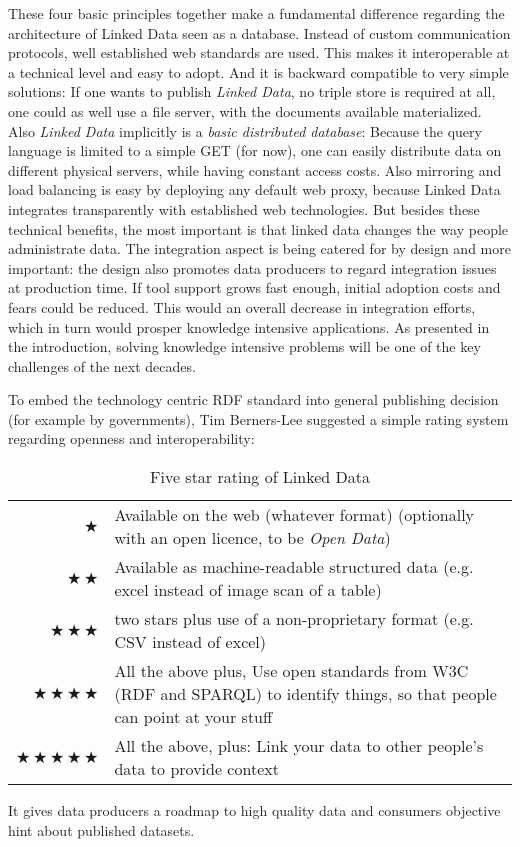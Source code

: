 These four basic principles together make a fundamental difference regarding the architecture of Linked Data seen as a database. 
Instead of custom communication protocols, well established web standards are used. 
This makes it interoperable at a technical level and easy to adopt.
And it is backward compatible to very simple solutions: If one wants to publish \textit{Linked Data}, no triple store is required at all, one could as well use a file server, with the documents available materialized.
Also \textit{Linked Data} implicitly is a \textit{basic distributed database}: Because the query language is limited to a simple GET (for now), one can easily distribute data on different physical servers, while having constant access costs. 
Also mirroring and load balancing is easy by deploying any default web proxy, because Linked Data integrates transparently with established web technologies. 
But besides these technical benefits, the most important is that linked data changes the way people administrate data. 
The integration aspect is being catered for by design and more important: the design also promotes data producers to regard integration issues at production time. 
If tool support grows fast enough, initial adoption costs and fears could be reduced. 
This would an overall decrease in integration efforts, which in turn would prosper knowledge intensive applications. 
As presented in the introduction, solving knowledge intensive problems will be one of the key challenges of the next decades.

To embed the technology centric RDF standard into general publishing decision (for example by governments), Tim Berners-Lee suggested a simple rating system regarding openness and interoperability:

  \begin{table}[htb]
  	\small
  	\caption{Five star rating of Linked Data}
	\begin{tabular}{rp{}}
$\bigstar$ & Available on the web (whatever format) (optionally with an open licence, to be \textit{Open Data}) \\ 
$\bigstar\,\bigstar$ & Available as machine-readable structured data (e.g. excel instead of image scan of a table) \\ 
$\bigstar\,\bigstar\,\bigstar$ &  two stars plus use of a non-proprietary format (e.g. CSV instead of excel) \\ 
$\bigstar\,\bigstar\,\bigstar\,\bigstar$ & All the above plus, Use open standards from W3C (RDF and SPARQL) to identify things, so that people can point at your stuff \\ 
$\bigstar\,\bigstar\,\bigstar\,\bigstar\,\bigstar$ & All the above, plus: Link your data to other people’s data to provide context
    \end{tabular}
  \end{table}
It gives data producers a roadmap to high quality data and consumers objective hint about published datasets.

